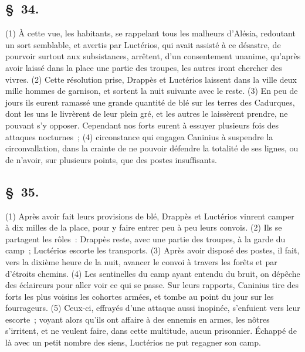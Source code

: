 \documentclass[french,twoside]{book} %
\begin{document}
\subsection[{§ 34.}]{ \textsc{§ 34.} }
\noindent (1) À cette vue, les habitants, se rappelant tous les malheurs d’Alésia, redoutant un sort semblable, et avertis par Luctérios, qui avait assisté à ce désastre, de pourvoir surtout aux subsistances, arrêtent, d’un consentement unanime, qu’après avoir laissé dans la place une partie des troupes, les autres iront chercher des vivres. (2) Cette résolution prise, Drappès et Luctérios laissent dans la ville deux mille hommes de garnison, et sortent la nuit suivante avec le reste. (3) En peu de jours ils eurent ramassé une grande quantité de blé sur les terres des Cadurques, dont les uns le livrèrent de leur plein gré, et les autres le laissèrent prendre, ne pouvant s’y opposer. Cependant nos forts eurent à essuyer plusieurs fois des attaques nocturnes ; (4) circonstance qui engagea Caninius à suspendre la circonvallation, dans la crainte de ne pouvoir défendre la totalité de ses lignes, ou de n’avoir, sur plusieurs points, que des postes insuffisants.
\subsection[{§ 35.}]{ \textsc{§ 35.} }
\noindent (1) Après avoir fait leurs provisions de blé, Drappès et Luctérios vinrent camper à dix milles de la place, pour y faire entrer peu à peu leurs convois. (2) Ils se partagent les rôles : Drappès reste, avec une partie des troupes, à la garde du camp ; Luctérios escorte les transports. (3) Après avoir disposé des postes, il fait, vers la dixième heure de la nuit, avancer le convoi à travers les forêts et par d’étroits chemins. (4) Les sentinelles du camp ayant entendu du bruit, on dépêche des éclaireurs pour aller voir ce qui se passe. Sur leurs rapports, Caninius tire des forts les plus voisins les cohortes armées, et tombe au point du jour sur les fourrageurs. (5) Ceux-ci, effrayés d’une attaque aussi inopinée, s’enfuient vers leur escorte ; voyant alors qu’ils ont affaire à des ennemis en armes, les nôtres s’irritent, et ne veulent faire, dans cette multitude, aucun prisonnier. Échappé de là avec un petit nombre des siens, Luctérios ne put regagner son camp.
\end{document}
